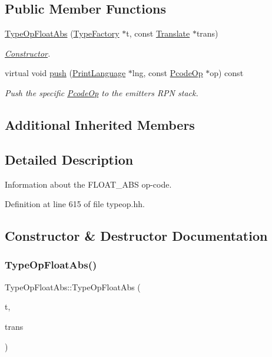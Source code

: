 \subsection*{Public Member Functions}
\begin{DoxyCompactItemize}
\item 
\mbox{\hyperlink{class_type_op_float_abs_a3f3625fa9f470c9872b1b68b7671d9c7}{Type\+Op\+Float\+Abs}} (\mbox{\hyperlink{class_type_factory}{Type\+Factory}} $\ast$t, const \mbox{\hyperlink{class_translate}{Translate}} $\ast$trans)
\begin{DoxyCompactList}\small\item\em \mbox{\hyperlink{class_constructor}{Constructor}}. \end{DoxyCompactList}\item 
virtual void \mbox{\hyperlink{class_type_op_float_abs_aea9d2558117c0cbe21acb48625fe03b2}{push}} (\mbox{\hyperlink{class_print_language}{Print\+Language}} $\ast$lng, const \mbox{\hyperlink{class_pcode_op}{Pcode\+Op}} $\ast$op) const
\begin{DoxyCompactList}\small\item\em Push the specific \mbox{\hyperlink{class_pcode_op}{Pcode\+Op}} to the emitter\textquotesingle{}s R\+PN stack. \end{DoxyCompactList}\end{DoxyCompactItemize}
\subsection*{Additional Inherited Members}


\subsection{Detailed Description}
Information about the F\+L\+O\+A\+T\+\_\+\+A\+BS op-\/code. 

Definition at line 615 of file typeop.\+hh.



\subsection{Constructor \& Destructor Documentation}
\mbox{\label{class_type_op_float_abs_a3f3625fa9f470c9872b1b68b7671d9c7}} 
\subsubsection{\texorpdfstring{TypeOpFloatAbs()}{TypeOpFloatAbs()}}
{\footnotesize\ttfamily Type\+Op\+Float\+Abs\+::\+Type\+Op\+Float\+Abs (\begin{DoxyParamCaption}\item[{\mbox{\hyperlink{class_type_factory}{Type\+Factory}} $\ast$}]{t,  }\item[{const \mbox{\hyperlink{class_translate}{Translate}} $\ast$}]{trans }\end{DoxyParamCaption})}



